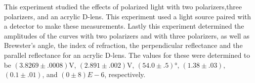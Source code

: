 
\usepackage{listings}


\physics

\begin{paperabs}
	
	This experiment studied the effects of polarized light with two polarizers,three polarizers, and an acrylic D-lens. This experiment used a light source paired with a detector to make these measurements. Lastly this experiment determined the amplitudes of the curves with two polarizers and with three polarizers, as well as Brewster's angle, the index of refraction, the perpendicular reflectance and the parallel reflectance for an acrylic D-lens. The values for these were determined to be $(3.8269 \pm .0008)\si{\volt}$, $(2.891 \pm .002) \si{\volt}$, $(54.0\pm.5)\si{\degree}$, $(1.38\pm.03)$, $(0.1\pm.01)$, and $(0\pm8)\si{E-6}$, respectively.
	
\end{paperabs}

